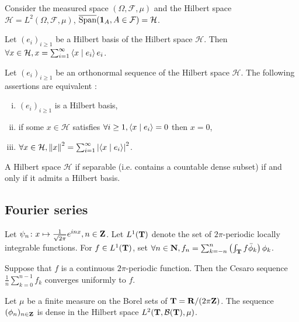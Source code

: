\begin{pop}
	Consider the measured space $(\Omega, \mathcal{F}, \mu)$ and the Hilbert space $\mathcal{H} = L^2(\Omega, \mathcal{F}, \mu)$, $\overline{\operatorname{Span}}(\operatorname{\mathbf{1}}_A, A \in \mathcal{F}) = \mathcal{H}$.
\end{pop}

\begin{thm}
	Let $(e_i)_{i \geq 1}$ be a Hilbert basis of the Hilbert space $\mathcal{H}$.
	Then $\forall x \in \mathcal{H}, x = \sum_{i = 1}^\infty \left\langle x \mid e_i \right\rangle e_i$.
\end{thm}

\begin{thm}
	Let $(e_i)_{i \geq 1}$ be an orthonormal sequence of the Hilbert space $\mathcal{H}$.
	The following assertions are equivalent :
	\begin{enumerate}[(i)]
		\item $(e_i)_{i \geq 1}$ is a Hilbert basis,
		\item if some $x \in \mathcal{H}$ satisfies $\forall i \geq 1, \left\langle x \mid e_i \right\rangle = 0$ then $x = 0$,
		\item $\forall x \in \mathcal{H}, \left\lVert x\right\rVert^2 = \sum_{i = 1}^\infty \left\lvert\left\langle x \mid e_i \right\rangle\right\rvert^2$.
	\end{enumerate}
\end{thm}

\begin{thm}
	A Hilbert space $\mathcal{H}$ if separable (i.e. contains a countable dense subset) if and only if it admits a Hilbert basis.
\end{thm}

\subsection{Fourier series}

	Let $\psi_n \colon x \mapsto \frac{1}{\sqrt{2\pi}} e^{inx}, n \in \mathbf{Z}$.
	Let $L^1(\mathbf{T})$ denote the set of $2\pi$-periodic locally integrable functions.
	For $f \in L^1(\mathbf{T})$, set $\forall n \in \mathbf{N}, f_n = \sum_{k = -n}^n \left( \int_{\mathbf{T}} f \bar\phi_k \right) \phi_k$.

	\begin{thm}
		Suppose that $f$ is a continuous $2\pi$-periodic function.
		Then the Cesaro sequence $\frac{1}{n} \sum_{k = 0}^{n - 1} f_k$ converges uniformly to $f$.
	\end{thm}

	\begin{cor}
		Let $\mu$ be a finite measure on the Borel sets of $\mathbf{T} = \mathbf{R} / (2\pi\mathbf{Z})$.
		The sequence $(\phi_n)_{n \in \mathbf{Z}}$ is dense in the Hilbert space $L^2(\mathbf{T}, \mathcal{B}(\mathbf{T}), \mu)$.
	\end{cor}

